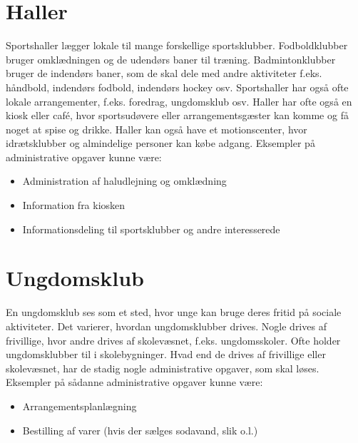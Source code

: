 

\section{Haller}

Sportshaller lægger lokale til mange forskellige sportsklubber.
Fodboldklubber bruger omklædningen og de udendørs baner til træning. 
Badmintonklubber bruger de indendørs baner, som de skal dele med andre aktiviteter f.eks. håndbold, indendørs fodbold, indendørs hockey osv.
Sportshaller har også ofte lokale arrangementer, f.eks. foredrag, ungdomsklub osv.
Haller har ofte også en kiosk eller café, hvor sportsudøvere eller arrangementsgæster kan komme og få noget at spise og drikke. 
Haller kan også have et motionscenter, hvor idrætsklubber og almindelige personer kan købe adgang\citep{spt_hal}. 
Eksempler på administrative opgaver kunne være:

\begin{itemize}
  \item Administration af haludlejning og omklædning 
  \item Information fra kiosken
  \item Informationsdeling til sportsklubber og andre interesserede
\end{itemize}


\section{Ungdomsklub}

En ungdomsklub ses som et sted, hvor unge kan bruge deres fritid på sociale aktiviteter.
Det varierer, hvordan ungdomsklubber drives. 
Nogle drives af frivillige, hvor andre drives af skolevæsnet, f.eks. ungdomsskoler\citep{ung1}.
Ofte holder ungdomsklubber til i skolebygninger. 
Hvad end de drives af frivillige eller skolevæsnet, har de stadig nogle administrative opgaver, som skal løses. 
Eksempler på sådanne administrative opgaver kunne være:

\begin{itemize}
  \item Arrangementsplanlægning
  \item Bestilling af varer (hvis der sælges sodavand, slik o.l.)
\end{itemize}


